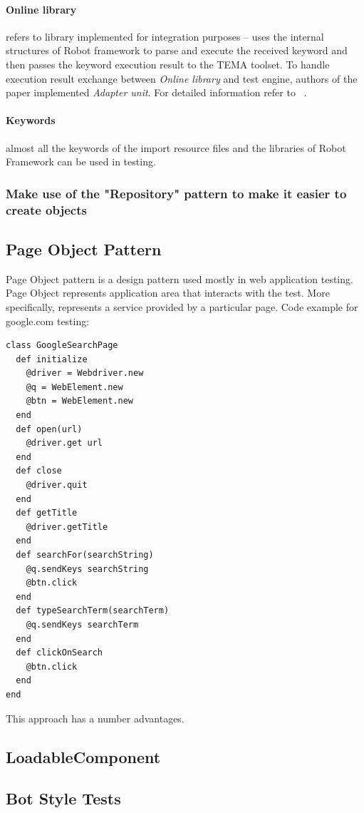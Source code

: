 \documentclass[12pt,twoside]{article}
\begin{document}
\paragraph{Online library}refers to library implemented for integration purposes -- uses the internal structures of Robot framework to parse and execute the received keyword and then passes the keyword execution result to the TEMA toolset. To handle execution result exchange between \emph{Online library} and test engine, authors of the paper implemented \emph{Adapter unit}. For detailed information refer to
~\cite{ref:2.1}.
\paragraph{Keywords} almost all the keywords of the import resource files and the libraries of Robot Framework can be used in testing.

\subsubsection{Make use of the "Repository" pattern to make it easier to create objects}


\subsection{Page Object Pattern}
Page Object pattern is a design pattern used mostly in web application testing. Page Object represents application area that interacts with the test. More specifically, represents a service provided by a particular page. 
Code example for google.com testing:

\begin{verbatim}
class GoogleSearchPage
  def initialize
    @driver = Webdriver.new
    @q = WebElement.new
    @btn = WebElement.new
  end
  def open(url)
    @driver.get url
  end
  def close
    @driver.quit
  end
  def getTitle
    @driver.getTitle
  end
  def searchFor(searchString)
    @q.sendKeys searchString
    @btn.click
  end
  def typeSearchTerm(searchTerm)
    @q.sendKeys searchTerm
  end
  def clickOnSearch
    @btn.click
  end
end
\end{verbatim}


This approach has a number advantages.


\subsection{LoadableComponent}
\subsection{Bot Style Tests}
\end{document}

